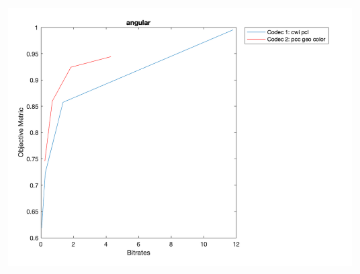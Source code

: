 \documentclass{article}
\begin{document}
\begin{figure}
    \begin{subfigure}[b]{0.65\textwidth}
    \includegraphics[width=\textwidth]{Figures/task2/guanyin_angular.png}
    \end{subfigure}
  
\end{figure}
\end{document}
